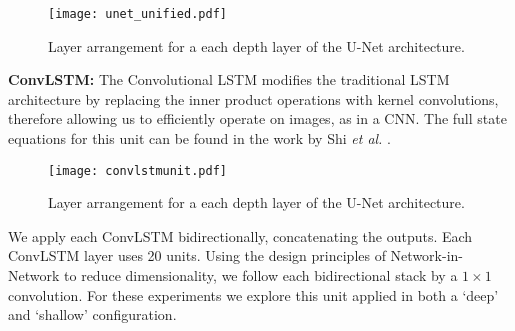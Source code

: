 \documentclass[journal,transmag]{IEEEtran}
\begin{document}

\begin{figure}
\centering
\texttt{[image: unet\_unified.pdf]}
\caption{Layer arrangement for a each depth layer of the U-Net architecture.}
\label{fig:unetfull}
\end{figure}

\textbf{ConvLSTM:} The Convolutional LSTM modifies the traditional LSTM architecture \cite{Hochreiter1997} by replacing the inner product operations with kernel convolutions, therefore allowing us to efficiently operate on images, as in a CNN. The full state equations for this unit can be found in the work by Shi \emph{et al.} \cite{SHI2015}.


\begin{figure}[t]
\centering
\texttt{[image: convlstmunit.pdf]}
\caption{Layer arrangement for a each depth layer of the U-Net architecture. }
\label{fig:convlstmunit}
\end{figure}

We apply each ConvLSTM bidirectionally, concatenating the outputs. Each ConvLSTM layer uses 20 units. Using the design principles of Network-in-Network \cite{Lin2013} to reduce dimensionality, we follow each bidirectional stack by a $1\times1$ convolution. For these experiments we explore this unit applied in both a `deep' and `shallow' configuration. 
\end{document}
